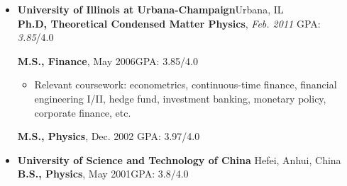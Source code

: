 \documentclass[10pt]{article}
\begin{document}
	\begin{itemize}
	\item[] \textbf{University of Illinois at Urbana-Champaign}{\hfill}Urbana, IL \\
	\vspace{1ex}
		\textbf{ Ph.D,  Theoretical Condensed Matter Physics}, \emph{Feb. 2011} {\hfill}GPA: \emph{3.85}/4.0\\		 
		\textbf{ M.S., Finance}, {May 2006}\hfill GPA: {3.85}/4.0\\

	 \begin{itemize}
	 \item Relevant coursework: {econometrics, continuous-time finance, financial engineering I/II, hedge fund, investment banking, monetary policy, corporate finance, etc}.
		\end{itemize}

	\textbf{ M.S., Physics}, Dec. 2002{\hfill} GPA: 3.97/4.0\\
	\vspace{0.1in}
  \item[]\textbf{University of Science and Technology of China}{\hfill} Hefei, Anhui, China\\
		\textbf{ B.S., Physics}, May 2001{\hfill}GPA: 3.8/4.0
	\end{itemize}
\end{document}
